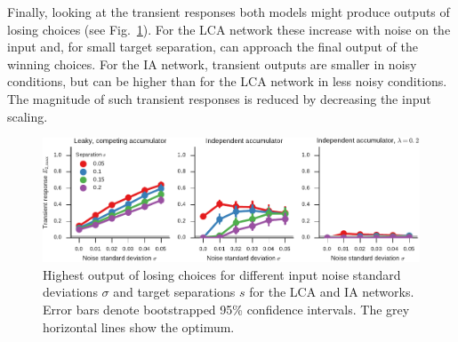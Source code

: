 \documentclass[10pt,letterpaper]{article}
\begin{document}
Finally, looking at the transient responses both models might produce outputs of losing choices (see Fig.~\ref{fig:transient}).
For the LCA network these increase with noise on the input and, for small target separation, can approach the final output of the winning choices.
For the IA network, transient outputs are smaller in noisy conditions, but can be higher than for the LCA network in less noisy conditions.
The magnitude of such transient responses is reduced by decreasing the input scaling.
\begin{figure}
    \centering
    \includegraphics{figures/transient}
    \caption{ \label{fig:transient}
        Highest output of losing choices for different input noise standard deviations $\sigma$ and target separations $s$ for the LCA and IA networks.
        Error bars denote bootstrapped 95\% confidence intervals.
        The grey horizontal lines show the optimum.
    }
\end{figure}
\end{document}
